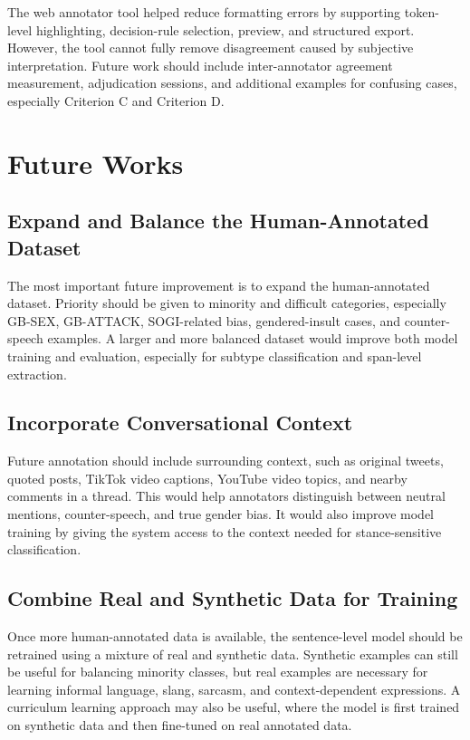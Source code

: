 \documentclass[12pt,oneside,openright,a4paper]{cpe-english-project}
\begin{document}
The web annotator tool helped reduce formatting errors by supporting token-level highlighting, decision-rule selection, preview, and structured export. However, the tool cannot fully remove disagreement caused by subjective interpretation. Future work should include inter-annotator agreement measurement, adjudication sessions, and additional examples for confusing cases, especially Criterion C and Criterion D.

\section{Future Works}

\subsection{Expand and Balance the Human-Annotated Dataset}

The most important future improvement is to expand the human-annotated dataset. Priority should be given to minority and difficult categories, especially GB-SEX, GB-ATTACK, SOGI-related bias, gendered-insult cases, and counter-speech examples. A larger and more balanced dataset would improve both model training and evaluation, especially for subtype classification and span-level extraction.

\subsection{Incorporate Conversational Context}

Future annotation should include surrounding context, such as original tweets, quoted posts, TikTok video captions, YouTube video topics, and nearby comments in a thread. This would help annotators distinguish between neutral mentions, counter-speech, and true gender bias. It would also improve model training by giving the system access to the context needed for stance-sensitive classification.

\subsection{Combine Real and Synthetic Data for Training}

Once more human-annotated data is available, the sentence-level model should be retrained using a mixture of real and synthetic data. Synthetic examples can still be useful for balancing minority classes, but real examples are necessary for learning informal language, slang, sarcasm, and context-dependent expressions. A curriculum learning approach may also be useful, where the model is first trained on synthetic data and then fine-tuned on real annotated data.
\end{document}
